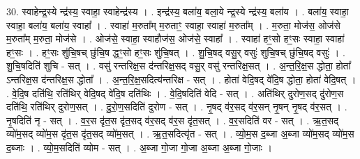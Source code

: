 \documentclass[17pt]{extarticle}
\begin{document}
30. स्वाहेन्द्र॒स्ये न्द्र॑स्य॒ स्वाहा॒ स्वाहेन्द्र॑स्य । . इन्द्र॑स्य॒ बला॑य॒ बला॒ये न्द्र॒स्ये न्द्र॑स्य॒ बला॑य । . बला॑य॒ स्वाहा॒ स्वाहा॒ बला॑य॒ बला॑य॒ स्वाहा᳚ । . स्वाहा॑ म॒रुता᳚म् म॒रुताꣳ॒॒ स्वाहा॒ स्वाहा॑ म॒रुता᳚म् । . म॒रुता॒ मोज॑स॒ ओज॑से म॒रुता᳚म् म॒रुता॒ मोज॑से । . ओज॑से॒ स्वाहा॒ स्वाहौज॑स॒ ओज॑से॒ स्वाहा᳚ । . स्वाहा॑ हꣳ॒॒सो हꣳ॒॒सः स्वाहा॒ स्वाहा॑ हꣳ॒॒सः । . हꣳ॒॒सः शु॑चि॒षच् छु॑चि॒ष द्धꣳ॒॒सो हꣳ॒॒सः शु॑चि॒षत् । . शु॒चि॒षद् वसु॒र् वसुः॑ शुचि॒षच् छु॑चि॒षद् वसुः॑ । . शु॒चि॒षदिति॑ शुचि - सत् । . वसु॑ रन्तरिक्ष॒स द॑न्तरिक्ष॒सद् वसु॒र् वसु॑ रन्तरिक्ष॒सत् । . अ॒न्त॒रि॒क्ष॒स द्धोता॒ होता᳚ ऽन्तरिक्ष॒स द॑न्तरिक्ष॒स द्धोता᳚ । . अ॒न्त॒रि॒क्ष॒सदित्य॑न्तरिक्ष - सत् । . होता॑ वेदि॒षद् वे॑दि॒ष द्धोता॒ होता॑ वेदि॒षत् । . वे॒दि॒ष दति॑थि॒ रति॑थिर् वेदि॒षद् वे॑दि॒ष दति॑थिः । . वे॒दि॒षदिति॑ वेदि - सत् । . अति॑थिर् दुरोण॒सद् दु॑रोण॒स दति॑थि॒ रति॑थिर् दुरोण॒सत् । . दु॒रो॒ण॒सदिति॑ दुरोण - सत् । . नृ॒षद् व॑र॒सद् व॑र॒सन् नृ॒षन् नृ॒षद् व॑र॒सत् । . नृ॒षदिति॑ नृ - सत् । . व॒र॒स दृ॑त॒स दृ॑त॒सद् व॑र॒सद् व॑र॒स दृ॑त॒सत् । . व॒र॒सदिति॑ वर - सत् । . ऋ॒त॒सद् व्यो॑म॒सद् व्यो॑म॒स दृ॑त॒स दृ॑त॒सद् व्यो॑म॒सत् । . ऋ॒त॒सदित्यृ॑त - सत् । . व्यो॒म॒स द॒ब्जा अ॒ब्जा व्यो॑म॒सद् व्यो॑म॒स द॒ब्जाः । . व्यो॒म॒सदिति॑ व्योम - सत् । . अ॒ब्जा गो॒जा गो॒जा अ॒ब्जा अ॒ब्जा गो॒जाः । \newline
\end{document}
